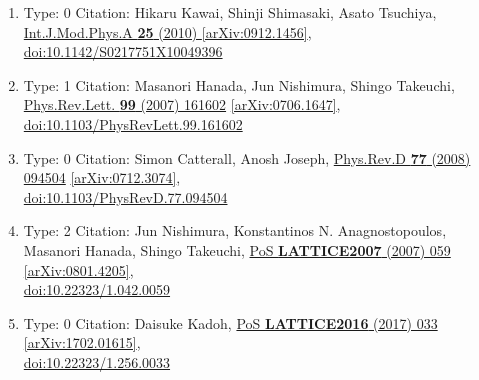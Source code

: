 \documentclass[a4paper,10pt]{article}
\begin{document}
\begin{enumerate}
\begin{enumerate}
  \item Type: 0 Citation: Hikaru Kawai, Shinji Shimasaki, Asato Tsuchiya, \href{https://www.doi.org/10.1142/S0217751X10049396}{Int.J.Mod.Phys.A {\bf 25} (2010) }  \href{https://arxiv.org/abs/0912.1456}{[arXiv:0912.1456]},\\\href{https://www.doi.org/10.1142/S0217751X10049396}{doi:10.1142/S0217751X10049396}
  \item Type: 1 Citation: Masanori Hanada, Jun Nishimura, Shingo Takeuchi, \href{https://www.doi.org/10.1103/PhysRevLett.99.161602}{Phys.Rev.Lett. {\bf 99} (2007) 161602}  \href{https://arxiv.org/abs/0706.1647}{[arXiv:0706.1647]},\\\href{https://www.doi.org/10.1103/PhysRevLett.99.161602}{doi:10.1103/PhysRevLett.99.161602}
  \item Type: 0 Citation: Simon Catterall, Anosh Joseph, \href{https://www.doi.org/10.1103/PhysRevD.77.094504}{Phys.Rev.D {\bf 77} (2008) 094504}  \href{https://arxiv.org/abs/0712.3074}{[arXiv:0712.3074]},\\\href{https://www.doi.org/10.1103/PhysRevD.77.094504}{doi:10.1103/PhysRevD.77.094504}
  \item Type: 2 Citation: Jun Nishimura, Konstantinos N. Anagnostopoulos, Masanori Hanada, Shingo Takeuchi, \href{https://www.doi.org/10.22323/1.042.0059}{PoS {\bf LATTICE2007} (2007) 059}  \href{https://arxiv.org/abs/0801.4205}{[arXiv:0801.4205]},\\\href{https://www.doi.org/10.22323/1.042.0059}{doi:10.22323/1.042.0059}
  \item Type: 0 Citation: Daisuke Kadoh, \href{https://www.doi.org/10.22323/1.256.0033}{PoS {\bf LATTICE2016} (2017) 033}  \href{https://arxiv.org/abs/1702.01615}{[arXiv:1702.01615]},\\\href{https://www.doi.org/10.22323/1.256.0033}{doi:10.22323/1.256.0033}

\end{enumerate}
\end{enumerate}
\end{document}
